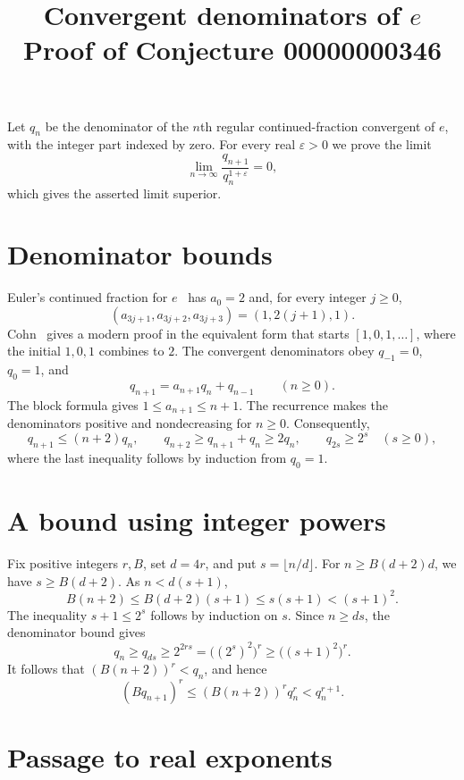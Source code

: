 \documentclass[11pt]{article}
\title{Convergent denominators of \(e\)\\[2pt]\large Proof of Conjecture 00000000346}
\author{}
\date{}
\begin{document}
\maketitle

\noindent
Let $q_n$ be the denominator of the $n$th regular continued-fraction
convergent of $e$, with the integer part indexed by zero. For every real
$\varepsilon>0$ we prove the limit
\[
\lim_{n\to\infty}\frac{q_{n+1}}{q_n^{1+\varepsilon}}=0,
\]
which gives the asserted limit superior.

\section*{Denominator bounds}

Euler's continued fraction for $e$~\cite[\S21]{euler} has $a_0=2$ and,
for every integer $j\ge 0$,
\[
(a_{3j+1},a_{3j+2},a_{3j+3})=(1,2(j+1),1).
\]
Cohn~\cite[Theorem~1]{cohn} gives a modern proof in the equivalent form
that starts $[1,0,1,\ldots]$, where the initial $1,0,1$ combines to $2$.
The convergent denominators obey $q_{-1}=0$, $q_0=1$, and
\[
q_{n+1}=a_{n+1}q_n+q_{n-1}\qquad(n\ge0).
\]
The block formula gives $1\le a_{n+1}\le n+1$. The recurrence makes
the denominators positive and nondecreasing for $n\ge0$. Consequently,
\[
q_{n+1}\le(n+2)q_n,
\qquad
q_{n+2}\ge q_{n+1}+q_n\ge2q_n,
\qquad
q_{2s}\ge2^s\quad(s\ge0),
\]
where the last inequality follows by induction from $q_0=1$.

\section*{A bound using integer powers}

Fix positive integers $r,B$, set $d=4r$, and put $s=\lfloor n/d\rfloor$.
For $n\ge B(d+2)d$, we have $s\ge B(d+2)$. As $n<d(s+1)$,
\[
B(n+2)\le B(d+2)(s+1)\le s(s+1)<(s+1)^2.
\]
The inequality $s+1\le2^s$ follows by induction on $s$. Since $n\ge ds$,
the denominator bound gives
\[
q_n\ge q_{ds}\ge 2^{2rs}=\bigl((2^s)^2\bigr)^r
    \ge \bigl((s+1)^2\bigr)^r.
\]
It follows that $(B(n+2))^r<q_n$, and hence
\begin{equation}
 (Bq_{n+1})^r\le (B(n+2))^r q_n^r<q_n^{r+1}.
 \label{eq:integer-bound}
\end{equation}

\section*{Passage to real exponents}
\end{document}
